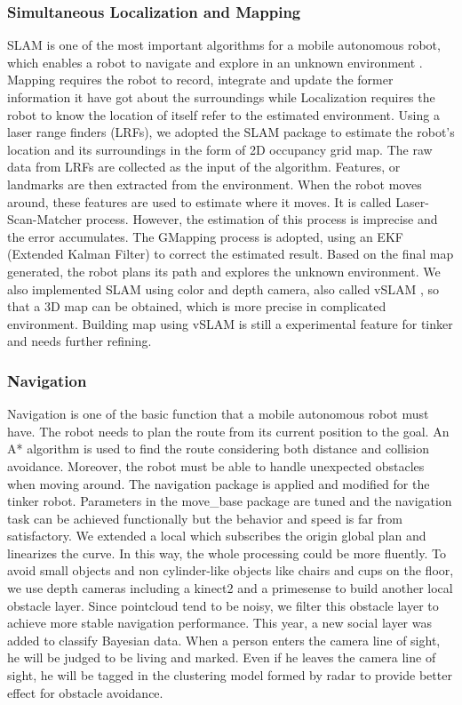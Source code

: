 \subsubsection{Simultaneous Localization and Mapping}
SLAM is one of the most important algorithms for a mobile autonomous robot, which enables a robot to navigate and explore in an unknown environment \cite{grisetti2007improved}. Mapping requires the robot to record, integrate and update the former information it have got about the surroundings while Localization requires the robot to know the location of itself refer to the estimated environment. Using a laser range finders (LRFs), we adopted the SLAM package to estimate the robot’s location and its surroundings in the form of 2D occupancy grid map. The raw data from LRFs are collected as the input of the algorithm. Features, or landmarks are then extracted from the environment. When the robot moves around, these features are used to estimate where it moves. It is called Laser-Scan-Matcher process. However, the estimation of this process is imprecise and the error accumulates. The GMapping process is adopted, using an EKF (Extended Kalman Filter) to correct the estimated result. Based on the final map generated, the robot plans its path and explores the unknown environment.
We also implemented SLAM using color and depth camera, also called vSLAM \cite{se2005vision}, so that a 3D map can be obtained, which is more precise in complicated environment. Building map using vSLAM is still a experimental feature for tinker and needs further refining.
\subsubsection{Navigation}
Navigation is one of the basic function that a mobile autonomous robot must have. The robot needs to plan the route from its current position to the goal. An A* algorithm is used to find the route considering both distance and  collision avoidance. Moreover, the robot must be able to handle unexpected obstacles when moving around. The navigation package is applied and modified for the tinker robot. Parameters in the move\_base package are tuned and the navigation task can be achieved functionally but the behavior and speed is far from satisfactory. We extended a local  which subscribes the origin global plan and linearizes the curve. In this way, the whole processing could be more fluently. 
To avoid small objects and non cylinder-like objects like chairs and cups on the floor, we use depth cameras including a kinect2 and a primesense to build another local obstacle layer. Since pointcloud tend to be noisy, we filter this obstacle layer to achieve more stable navigation performance.
This year, a new social layer was added to classify Bayesian data. When a person enters the camera line of sight, he will be judged to be living and marked. Even if he leaves the camera line of sight, he will be tagged in the clustering model formed by radar to provide better effect for obstacle avoidance. 
